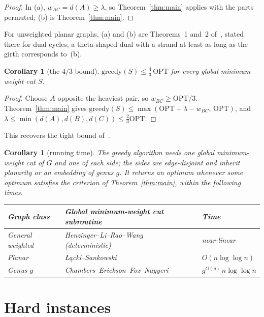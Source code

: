 \documentclass[preprint,12pt]{elsarticle}
\newtheorem{corollary}[theorem]{Corollary}
\theoremstyle{definition}
\newcommand{\OPT}{\mathrm{OPT}}
\newcommand{\greedy}{\mathrm{greedy}}
\begin{document}
\begin{proof}
In (a), $w_{AC}=d(A)\ge\lambda$, so Theorem~\ref{thm:main} applies with the parts permuted; (b) is
Theorem~\ref{thm:main}.
\end{proof}

For unweighted planar graphs, (a) and (b) are Theorems~1 and~2 of~\cite{HochbaumShmoys1985}, stated
there for dual cycles; a theta-shaped dual with a strand at least as long as the girth corresponds
to~(b).

\begin{corollary}[the $4/3$ bound]\label{cor:43}
$\greedy(S)\le\tfrac43\,\OPT$ for every global minimum-weight cut $S$.
\end{corollary}

\begin{proof}
Choose $A$ opposite the heaviest pair, so $w_{BC}\ge\OPT/3$. Theorem~\ref{thm:main} gives
$\greedy(S)\le\max(\OPT+\lambda-w_{BC},\,\OPT)$, and
$\lambda\le\min(d(A),d(B),d(C))\le\tfrac23\OPT$.
\end{proof}

This recovers the tight bound of~\cite{HochbaumTsai1983}.

\begin{corollary}[running time]\label{cor:time}
The greedy algorithm needs one global minimum-weight cut of $G$ and one of each side; the sides are
edge-disjoint and inherit planarity or an embedding of genus $g$. It returns an optimum whenever some
optimum satisfies the criterion of Theorem~\ref{thm:main}, within the following times.
\begin{center}
\begin{tabular}{lll}
\toprule
Graph class & Global minimum-weight cut subroutine & Time\\
\midrule
General weighted & Henzinger--Li--Rao--Wang~\cite{HenzingerLRW2024} (deterministic) & near-linear\\
Planar & {\L}{\k{a}}cki--Sankowski~\cite{LackiSankowski2011} & $O(n\log\log n)$\\
Genus $g$ & Chambers--Erickson--Fox--Nayyeri~\cite{ChambersEFN} & $g^{O(g)}\,n\log\log n$\\
\bottomrule
\end{tabular}
\end{center}
\end{corollary}

\section{Hard instances}\label{sec:hard}
\end{document}
